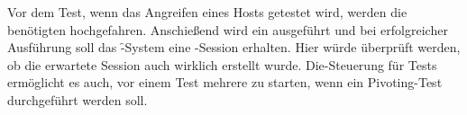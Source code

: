 Vor dem Test, \zB wenn das Angreifen eines Hosts getestet wird, werden die
benötigten  hochgefahren. Anschießend wird ein 
ausgeführt und bei erfolgreicher Ausführung soll das \f-System eine
-Session erhalten. Hier würde \zB überprüft werden, ob die erwartete
Session auch wirklich erstellt wurde. Die-Steuerung für Tests
ermöglicht es auch, vor einem Test mehrere  zu starten, wenn
\zB ein Pivoting-Test durchgeführt werden soll.
